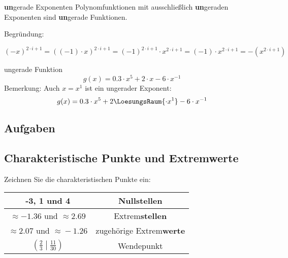 \begin{gesetz}{\textbf{un}gerade Exponenten}{}
  Polynomfunktionen mit ausschließlich \textbf{un}geraden Exponenten sind \textbf{un}gerade Funktionen.

  Begründung:

  $$(-x)^{2\cdot{}i + 1} = ((-1)\cdot{}x)^{2\cdot{}i+1} = (-1)^{2\cdot{}i+1} \cdot{} x^{2\cdot{}i+1} = (-1)\cdot{}x^{2\cdot{}i+1} = -\left(x^{2\cdot{}i+1}\right)$$

\end{gesetz}

\begin{beispiel}{ungerade Funktion}{}
  $$g(x) = 0.3\cdot{}x^5 + 2\cdot{}x  -6\cdot{}x^{-1}$$
  Bemerkung: Auch $x=x^1$ ist ein ungerader Exponent:
  $$g(x) = 0.3\cdot{}x^5 + 2\LoesungsRaum{\cdot{}x^1} -6\cdot{}x^{-1}$$  
\end{beispiel}
\newpage


\subsection*{Aufgaben}

 





\newpage



\subsection{Charakteristische Punkte und Extremwerte}

Zeichnen Sie die charakteristischen Punkte ein:


\begin{tabular}{|c|c|}\hline
  -3, 1 und 4 & Nullstellen \\\hline
  $\approx -1.36$ und $\approx{} 2.69$ & Extrem\textbf{stellen}\\\hline
  $\approx 2.07 $ und $\approx{} -1.26$ & zugehörige Extrem\textbf{werte}\\\hline
  $\left(\frac23\middle|\frac{11}{30}\right)$ & Wendepunkt\\\hline
  \end{tabular} 


